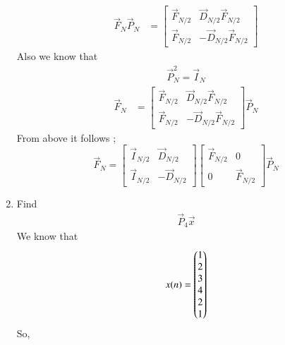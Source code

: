 \documentclass[journal,12pt,twocolumn]{IEEEtran}
\renewcommand\thesection{\arabic{section}}
\begin{document}
\begin{enumerate}[label=\arabic*.,ref=\thesection.\theenumi]
\begin{align}
                \vec{F}_{N}\vec{P}_{N} & =\begin{bmatrix}
                                               \vec{F}_{N/2} & \vec{D}_{N/2}\vec{F}_{N/2} \\ \vec{F}_{N/2}&-\vec{D}_{N/2}\vec{F}_{N/2}
                                          \end{bmatrix}
           \end{align}
           Also we know that
           \begin{align}
                \vec{P}_{N}^2 = \vec{I}_{N} \label{fft-4}
           \end{align}
           \begin{align}
                \vec{F}_{N} & =\begin{bmatrix}
                                    \vec{F}_{N/2} & \vec{D}_{N/2}\vec{F}_{N/2} \\ \vec{F}_{N/2}&-\vec{D}_{N/2}\vec{F}_{N/2}
                               \end{bmatrix} \vec{P}_{N}
           \end{align}
           From above it follows ;
           \begin{equation}
                \vec{F}_{N}=
                \begin{bmatrix}
                     \vec{I}_{N/2} & \vec{D}_{N/2}  \\
                     \vec{I}_{N/2} & -\vec{D}_{N/2}
                \end{bmatrix}
                \begin{bmatrix}
                     \vec{F}_{N/2} & 0             \\
                     0             & \vec{F}_{N/2}
                \end{bmatrix}
                \vec{P}_{N}
           \end{equation}
     \item Find
           \begin{align}
                \vec{P}_4 \vec{x}
           \end{align}
           \solution We know that
           \begin{align}
                x(n)=\begin{pmatrix}1 \\2\\3\\4\\2\\1\end{pmatrix}
           \end{align}
           So,
           \begin{equation}

\end{equation}
\end{enumerate}
\end{document}
